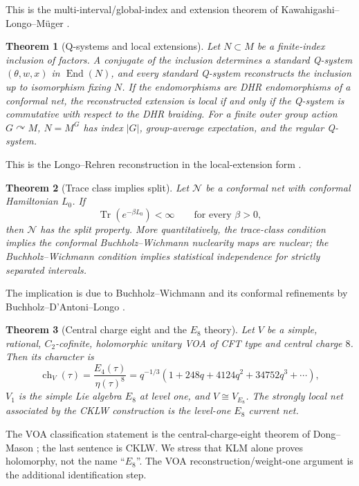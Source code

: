 \documentclass[11pt]{article}
\newtheorem{theorem}{Theorem}[section]
\theoremstyle{remark}
\newcommand{\Tr}{\operatorname{Tr}}
\begin{document}
This is the multi-interval/global-index and extension theorem of
Kawahigashi--Longo--M\"uger \cite{KLM}.

\begin{theorem}[Q-systems and local extensions]
\label{thm:Qsystems}
Let $N\subset M$ be a finite-index inclusion of factors.  A conjugate of
the inclusion determines a standard Q-system $(\theta,w,x)$ in
$\operatorname{End}(N)$, and every standard Q-system reconstructs the
inclusion up to isomorphism fixing $N$.  If the endomorphisms are DHR
endomorphisms of a conformal net, the reconstructed extension is local
if and only if the Q-system is commutative with respect to the DHR
braiding.  For a finite outer group action $G\curvearrowright M$,
$N=M^G$ has index $|G|$, group-average expectation, and the regular
Q-system.
\end{theorem}

This is the Longo--Rehren reconstruction in the local-extension form
\cite{LongoRehren}.

\begin{theorem}[Trace class implies split]\label{thm:split}
Let $\mathcal N$ be a conformal net with conformal Hamiltonian $L_0$.
If
\[
 \Tr(e^{-\beta L_0})<\infty\qquad\text{for every }\beta>0,
\tag{3.5}\label{eq:traceclass}
\]
then $\mathcal N$ has the split property.  More quantitatively, the
trace-class condition implies the conformal Buchholz--Wichmann
nuclearity maps are nuclear; the Buchholz--Wichmann condition implies
statistical independence for strictly separated intervals.
\end{theorem}

The implication is due to Buchholz--Wichmann and its conformal
refinements by Buchholz--D'Antoni--Longo \cite{BuchholzWichmann,BDL}.

\begin{theorem}[Central charge eight and the $E_8$ theory]
\label{thm:DM}
Let $V$ be a simple, rational, $C_2$-cofinite, holomorphic unitary VOA of
CFT type and central charge $8$.  Then its character is
\[
 \operatorname{ch}_V(\tau)
 =\frac{E_4(\tau)}{\eta(\tau)^8}
 =q^{-1/3}(1+248q+4124q^2+34752q^3+\cdots),
\tag{3.6}\label{eq:E8char}
\]
$V_1$ is the simple Lie algebra $E_8$ at level one, and
$V\cong V_{E_8}$.  The strongly local net associated by the CKLW
construction is the level-one $E_8$ current net.
\end{theorem}

The VOA classification statement is the central-charge-eight theorem of
Dong--Mason \cite{DongMason}; the last sentence is CKLW.  We stress that
KLM alone proves holomorphy, not the name ``$E_8$''.  The VOA
reconstruction/weight-one argument is the additional identification step.
\end{document}
